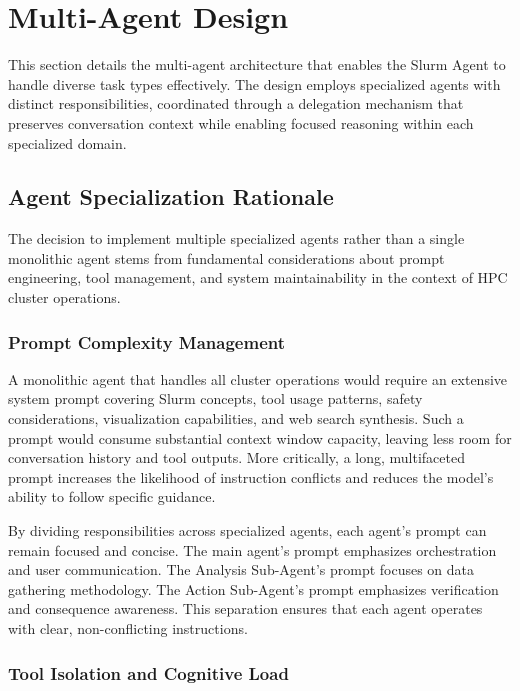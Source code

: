 \section{Multi-Agent Design}
\label{sec:agent-design}

This section details the multi-agent architecture that enables the Slurm Agent to handle diverse task types effectively. The design employs specialized agents with distinct responsibilities, coordinated through a delegation mechanism that preserves conversation context while enabling focused reasoning within each specialized domain.

\subsection{Agent Specialization Rationale}

The decision to implement multiple specialized agents rather than a single monolithic agent stems from fundamental considerations about prompt engineering, tool management, and system maintainability in the context of HPC cluster operations.

\subsubsection{Prompt Complexity Management}

A monolithic agent that handles all cluster operations would require an extensive system prompt covering Slurm concepts, tool usage patterns, safety considerations, visualization capabilities, and web search synthesis. Such a prompt would consume substantial context window capacity, leaving less room for conversation history and tool outputs. More critically, a long, multifaceted prompt increases the likelihood of instruction conflicts and reduces the model's ability to follow specific guidance.

By dividing responsibilities across specialized agents, each agent's prompt can remain focused and concise. The main agent's prompt emphasizes orchestration and user communication. The Analysis Sub-Agent's prompt focuses on data gathering methodology. The Action Sub-Agent's prompt emphasizes verification and consequence awareness. This separation ensures that each agent operates with clear, non-conflicting instructions.

\subsubsection{Tool Isolation and Cognitive Load}

